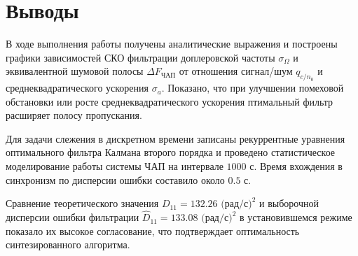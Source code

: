 \section{Выводы}
В ходе выполнения работы получены аналитические выражения и построены графики зависимостей СКО фильтрации доплеровской частоты $\sigma_\Omega$ и эквивалентной шумовой полосы $\Delta F_{\text{ЧАП}}$ от отношения сигнал/шум $q_{c/n_0}$ и среднеквадратического ускорения $\sigma_a$. Показано, что при улучшении помеховой обстановки или росте среднеквадратического ускорения птимальный фильтр расширяет полосу пропускания.

Для задачи слежения в дискретном времени записаны рекуррентные уравнения оптимального фильтра Калмана второго порядка и проведено статистическое моделирование работы системы ЧАП на интервале $1000\text{ с}$. Время вхождения в синхронизм по дисперсии ошибки составило около $0.5\text{ с}$.

Сравнение теоретического значения $D_{11} = 132.26\text{ (рад/с)}^2$ и выборочной дисперсии ошибки фильтрации $\hat{D}_{11} = 133.08\text{ (рад/с)}^2$ в установившемся режиме показало их высокое согласование, что подтверждает оптимальность синтезированного алгоритма.
